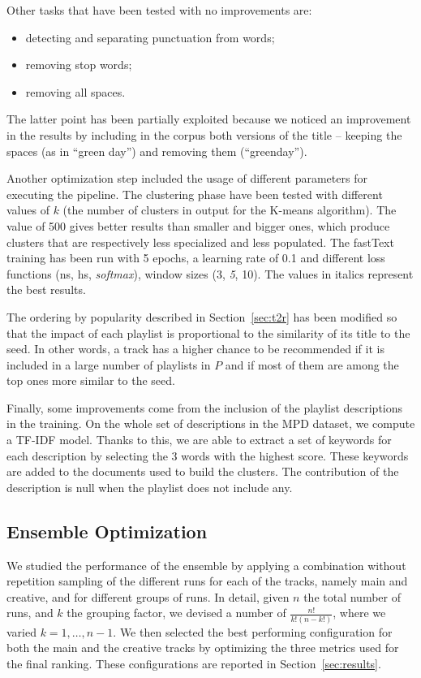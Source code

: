 Other tasks that have been tested with no improvements are:
\begin{itemize}
    \item detecting and separating punctuation from words;
    \item removing stop words;
    \item removing all spaces.
\end{itemize}

The latter point has been partially exploited because we noticed an improvement in the results by including in the corpus both versions of the title -- keeping the spaces (as in ``green day'') and removing them (``greenday'').

Another optimization step included the usage of different parameters for executing the pipeline. The clustering phase have been tested with different values of $k$ (the number of clusters in output for the K-means algorithm). The value of 500 gives better results than smaller and bigger ones, which produce clusters that are respectively less specialized and less populated. The fastText training has been run with 5 epochs, a learning rate of 0.1 and different loss functions (ns, hs, \textit{softmax}), window sizes (3, \textit{5}, 10). The values in italics represent the best results.

The ordering by popularity described in Section~\ref{sec:t2r} has been modified so that the impact of each playlist is proportional to the similarity of its title to the seed. In other words, a track has a higher chance to be recommended if it is included in a large number of playlists in $P$ and if most of them are among the top ones more similar to the seed.

Finally, some improvements come from the inclusion of the playlist descriptions in the training. On the whole set of descriptions in the MPD dataset, we compute a TF-IDF model. Thanks to this, we are able to extract a set of keywords for each description by selecting the 3 words with the highest score. These keywords are added to the documents used to build the clusters. The contribution of the description is null when the playlist does not include any.

\subsection{Ensemble Optimization}
We studied the performance of the ensemble by applying a combination without repetition sampling of the different runs for each of the tracks, namely main and creative, and for different groups of runs. In detail, given $n$ the total number of runs, and $k$ the grouping factor, we devised a number of $\frac{n!}{k!(n-k!)}$, where we varied $k=1,\dots,n-1$. We then selected the best performing configuration for both the main and the creative tracks by optimizing the three metrics used for the final ranking. These configurations are reported in Section~\ref{sec:results}.
